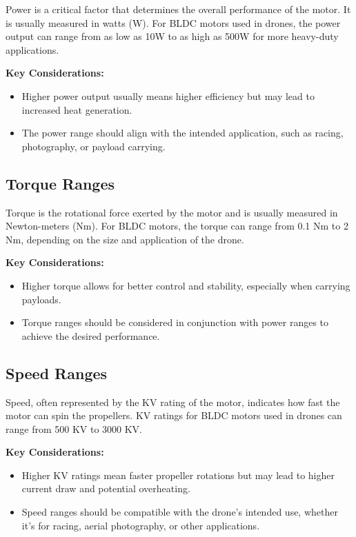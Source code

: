 \documentclass[12pt]{article}
\begin{document}
	Power is a critical factor that determines the overall performance of the motor. It is usually measured in watts (W). For BLDC motors used in drones, the power output can range from as low as 10W to as high as 500W for more heavy-duty applications.
	
	\textbf{Key Considerations:}
	\begin{itemize}
		\item Higher power output usually means higher efficiency but may lead to increased heat generation.
		\item The power range should align with the intended application, such as racing, photography, or payload carrying.
	\end{itemize}
	
	\subsection{Torque Ranges}
	
	Torque is the rotational force exerted by the motor and is usually measured in Newton-meters (Nm). For BLDC motors, the torque can range from 0.1 Nm to 2 Nm, depending on the size and application of the drone.
	
	\textbf{Key Considerations:}
	\begin{itemize}
		\item Higher torque allows for better control and stability, especially when carrying payloads.
		\item Torque ranges should be considered in conjunction with power ranges to achieve the desired performance.
	\end{itemize}
	
	\subsection{Speed Ranges}
	
	Speed, often represented by the KV rating of the motor, indicates how fast the motor can spin the propellers. KV ratings for BLDC motors used in drones can range from 500 KV to 3000 KV.
	
	\textbf{Key Considerations:}
	\begin{itemize}
		\item Higher KV ratings mean faster propeller rotations but may lead to higher current draw and potential overheating.
		\item Speed ranges should be compatible with the drone's intended use, whether it's for racing, aerial photography, or other applications.
	\end{itemize}
	
\end{document}
